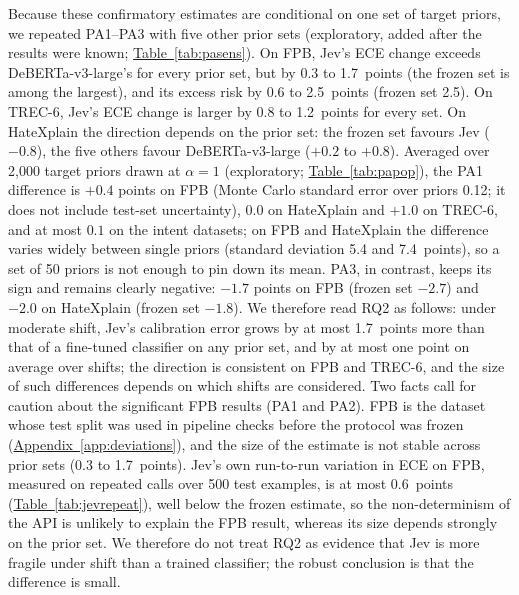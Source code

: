 Because these confirmatory estimates are conditional on one set of target priors, we repeated PA1--PA3 with five other
prior sets (exploratory, added after the results were known; \hyperref[tab:pasens]{Table~\ref*{tab:pasens}}). On FPB, Jev's ECE change exceeds
DeBERTa-v3-large's for every prior set, but by 0.3 to 1.7~points (the frozen set is among the largest), and its excess
risk by 0.6 to 2.5~points (frozen set 2.5). On TREC-6, Jev's ECE change is larger by 0.8 to 1.2~points for every set. On HateXplain the
direction depends on the prior set: the frozen set favours Jev ($-0.8$), the five others favour DeBERTa-v3-large ($+0.2$
to $+0.8$). Averaged over 2{,}000 target priors drawn at $\alpha=1$ (exploratory; \hyperref[tab:papop]{Table~\ref*{tab:papop}}), the PA1
difference is $+0.4$ points on FPB (Monte Carlo standard error over priors 0.12; it does not include test-set
uncertainty), $0.0$ on HateXplain and $+1.0$ on TREC-6, and at most $0.1$ on the intent datasets;
on FPB and HateXplain the difference varies widely between single priors (standard deviation 5.4 and 7.4~points), so a
set of 50 priors is not enough to pin down its mean. PA3, in contrast, keeps its sign and remains clearly negative:
$-1.7$ points on FPB (frozen set $-2.7$) and $-2.0$ on HateXplain (frozen set $-1.8$). We therefore read RQ2 as follows: under moderate shift, Jev's calibration error grows by at most 1.7~points more than that of a fine-tuned classifier on any prior set, and by at most one point on average over shifts;
the direction is consistent on FPB and TREC-6, and the size of such differences depends on which shifts are considered. Two facts call for caution about the significant FPB results (PA1 and PA2). FPB is the
dataset whose test split was used in pipeline checks before the protocol was frozen (\hyperref[app:deviations]{Appendix~\ref*{app:deviations}}),
and the size of the estimate is not stable across prior sets (0.3 to 1.7~points). Jev's own run-to-run variation in ECE
on FPB, measured on repeated calls over 500 test examples, is at most 0.6~points (\hyperref[tab:jevrepeat]{Table~\ref*{tab:jevrepeat}}), well below
the frozen estimate, so the non-determinism of the API is unlikely to explain the FPB result, whereas its size depends
strongly on the prior set. We therefore do not treat RQ2 as evidence that Jev is more fragile under shift than a trained classifier; the
robust conclusion is that the difference is small.

\begin{table}[t]
  \centering
  \caption{\textbf{The EM correction effect (PA3) is stable across shift scenarios, whereas the Jev--DeBERTa difference
  (PA1, PA2) varies in size, and on HateXplain in sign.} Frozen: the confirmatory estimate on the pre-specified set of 50
  target priors ($B=10{,}000$; $\dagger$: Holm-adjusted $p<0.05$). Exploratory: range of the estimates over five other sets
  of 50 priors ($B=1{,}000$ each) and the number of sets whose unadjusted 95\% interval excludes zero. Points.}
  \label{tab:pasens}
  \scriptsize
  
\end{table}

